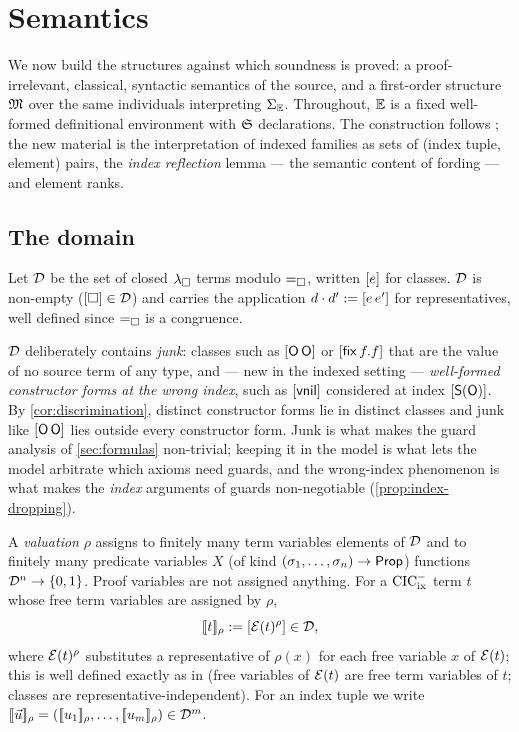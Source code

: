 \section{Semantics}
\label{sec:semantics}

We now build the structures against which soundness is proved: a
proof-irrelevant, classical, syntactic semantics of the source, and a
first-order structure $\mathfrak{M}$ over the same individuals interpreting
$\Sigma_{\mathbb{E}}$.  Throughout, $\mathbb{E}$ is a fixed well-formed definitional
environment with $\mathfrak{S}$ declarations.  The construction follows
\cite{Extraction2026}; the new material is the interpretation of indexed
families as sets of (index tuple, element) pairs, the \emph{index
reflection} lemma --- the semantic content of fording --- and element
ranks.

\subsection{The domain}
\label{sec:semantics-domain}

\begin{definition}[Domain]
\label{def:domain}
Let $\mathcal{D}$ be the set of closed $\lambda_{\square}$ terms modulo $=_{\square}$, written
$[e]$ for classes.  $\mathcal{D}$ is non-empty ($[\square] \in \mathcal{D}$) and
carries the application $d \cdot d' \mathrel{:=} [e\,e']$ for
representatives, well defined since $=_{\square}$ is a congruence.
\end{definition}

$\mathcal{D}$ deliberately contains \emph{junk}: classes such as
$[\mathsf{O}\,\mathsf{O}]$ or $[\mathsf{fix}\,f.f]$ that are the value of no
source term of any type, and --- new in the indexed setting ---
\emph{well-formed constructor forms at the wrong index}, such as
$[\mathsf{vnil}]$ considered at index $[\mathsf{S}(\mathsf{O})]$.  By
\cref{cor:discrimination}, distinct constructor forms lie in distinct
classes and junk like $[\mathsf{O}\,\mathsf{O}]$ lies outside every constructor
form.  Junk is what makes the guard analysis of \cref{sec:formulas}
non-trivial; keeping it in the model is what lets the model arbitrate
which axioms need guards, and the wrong-index phenomenon is what makes
the \emph{index} arguments of guards non-negotiable
(\cref{prop:index-dropping}).

\begin{definition}
\label{def:valuation}
A \emph{valuation} $\rho$ assigns to finitely many term variables
elements of $\mathcal{D}$ and to finitely many predicate variables $X$ (of kind
$(\sigma_1, \dots, \sigma_n) \to \mathsf{Prop}$) functions $\mathcal{D}^n \to \{0,1\}$.
Proof variables are not assigned anything.  For a $\mathrm{CIC}^{-}_{\mathrm{ix}}$ term $t$ whose
free term variables are assigned by $\rho$,
\[
  [\![ t ]\!]_\rho \mathrel{:=} [\mathcal{E}(t)^\rho] \in \mathcal{D},
\]
where $\mathcal{E}(t)^\rho$ substitutes a representative of $\rho(x)$ for
each free variable $x$ of $\mathcal{E}(t)$; this is well defined exactly as
in \cite{Extraction2026} (free variables of $\mathcal{E}(t)$ are free term
variables of $t$; classes are representative-independent).  For an index
tuple we write $[\![ \vec{u} ]\!]_\rho = ([\![ u_1 ]\!]_\rho, \dots,
[\![ u_m ]\!]_\rho) \in \mathcal{D}^m$.
\end{definition}

